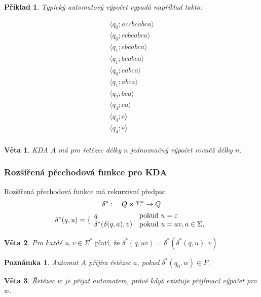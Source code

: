 \documentclass[10pt,a4paper]{article}
\theoremstyle{note}
\newtheorem{veta}{Věta}
\newtheorem{priklad}{Příklad}
\newtheorem{poznamka}{Poznámka}
\begin{document}
\newpage
\begin{priklad}
Typický automatový výpočet vypadá například takto:

\begin{gather*}
\langle q_0 ; accbcabca \rangle \\
\langle q_0 ; ccbcabca \rangle \\
\langle q_1 ; cbcabca \rangle \\
\langle q_1 ; bcabca \rangle \\
\langle q_0 ; cabca \rangle \\
\langle q_1 ; abca \rangle \\
\langle q_2 ; bca \rangle \\
\langle q_3 ; ca \rangle \\
\langle q_4 ; c \rangle \\
\langle q_4 ; \varepsilon \rangle \\
\end{gather*}
\end{priklad}

\begin{veta}
KDA $A$ má pro řetězec délky $n$ jednoznačný výpočet rovněž délky $n$.
\end{veta}

\subsubsection{Rozšířená přechodová funkce pro KDA}

Rozšířená přechodová funkce má rekurzivní předpis:
\begin{gather*}
\delta^*:\quad Q \times \Sigma^* \rightarrow Q \\
\delta^*(q, u) = \lbrace
\begin{array}{l l}
q & \text{pokud } u = \varepsilon \\
\delta^*(\delta(q, a), v) & \text{pokud } u = av, a \in \Sigma, 
\end{array}
\end{gather*}

\begin{veta}\label{veta-kdaaa}
Pro každé $u,v \in \Sigma^* \text{ platí, že } \delta^*(q, uv) = \delta^*(\delta^*(q, u), v)$
\end{veta}


\begin{poznamka}
Automat $A$ přijím řetězec $a$, pokud $\delta^*(q_0,w) \in F$.
\end{poznamka}

\begin{veta}
Řetězec $w$ je přijat automatem, právě když existuje přijímací výpočet pro $w$.
\end{veta}
\end{document}
